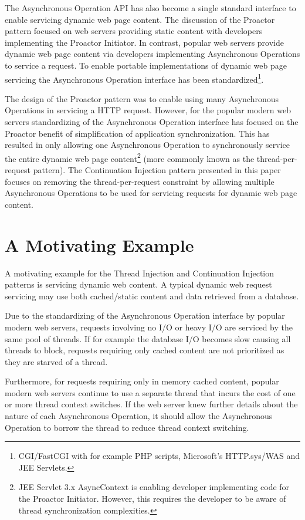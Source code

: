\documentclass[prodmode]{style/acmlarge}
\begin{document}
The Asynchronous Operation API has also become a single standard interface to
enable servicing dynamic web page content.  The discussion of the Proactor
pattern focused on web servers providing static content with developers
implementing the Proactor Initiator.  In contrast, popular web servers provide
dynamic web page content via developers implementing Asynchronous Operations to
service a request.  To enable portable implementations of dynamic web page
servicing the Asynchronous Operation interface has been
standardized\footnote{CGI/FastCGI with for example PHP scripts, Microsoft's
HTTP.sys/WAS and JEE Servlets.}.

The design of the Proactor pattern was to enable using many Asynchronous
Operations in servicing a HTTP request.  However, for the popular modern web
servers standardizing of the Asynchronous Operation interface has focused on the
Proactor benefit of simplification of application synchronization.  This has
resulted in only allowing one Asynchronous Operation to synchronously service
the entire dynamic web page content\footnote{JEE Servlet 3.x AsyncContext is
enabling developer implementing code for the Proactor Initiator.  However, this
requires the developer to be aware of thread synchronization complexities.} (more
commonly known as the thread-per-request pattern).  The Continuation Injection
pattern presented in this paper focuses on removing the thread-per-request
constraint by allowing multiple Asynchronous Operations to be used for servicing
requests for dynamic web page content.



\section{A Motivating Example}

A motivating example for the Thread Injection and Continuation Injection
patterns is servicing dynamic web content.  A typical dynamic web request
servicing may use both cached/static content and data retrieved from a database.

Due to the standardizing of the Asynchronous Operation interface by popular
modern web servers, requests involving no I/O or heavy I/O are serviced by the
same pool of threads.  If for example the database I/O becomes slow causing all
threads to block, requests requiring only cached content are not prioritized as
they are starved of a thread.

Furthermore, for requests requiring only in memory cached content, popular
modern web servers continue to use a separate thread that incurs the cost of one
or more thread context switches.  If the web server knew further details about
the nature of each Asynchronous Operation, it should allow the Asynchronous
Operation to borrow the thread to reduce thread context switching.
\end{document}
